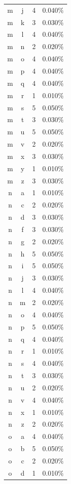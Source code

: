 \begin{longtable}{cccc}
    m & j & 4 & 0.040\% \\
    m & k & 3 & 0.030\% \\
    m & l & 4 & 0.040\% \\
    m & n & 2 & 0.020\% \\
    m & o & 4 & 0.040\% \\
    m & p & 4 & 0.040\% \\
    m & q & 4 & 0.040\% \\
    m & r & 1 & 0.010\% \\
    m & s & 5 & 0.050\% \\
    m & t & 3 & 0.030\% \\
    m & u & 5 & 0.050\% \\
    m & v & 2 & 0.020\% \\
    m & x & 3 & 0.030\% \\
    m & y & 1 & 0.010\% \\
    m & z & 3 & 0.030\% \\
    n & a & 1 & 0.010\% \\
    n & c & 2 & 0.020\% \\
    n & d & 3 & 0.030\% \\
    n & f & 3 & 0.030\% \\
    n & g & 2 & 0.020\% \\
    n & h & 5 & 0.050\% \\
    n & i & 5 & 0.050\% \\
    n & j & 3 & 0.030\% \\
    n & l & 4 & 0.040\% \\
    n & m & 2 & 0.020\% \\
    n & o & 4 & 0.040\% \\
    n & p & 5 & 0.050\% \\
    n & q & 4 & 0.040\% \\
    n & r & 1 & 0.010\% \\
    n & s & 4 & 0.040\% \\
    n & t & 3 & 0.030\% \\
    n & u & 2 & 0.020\% \\
    n & v & 4 & 0.040\% \\
    n & x & 1 & 0.010\% \\
    n & z & 2 & 0.020\% \\
    o & a & 4 & 0.040\% \\
    o & b & 5 & 0.050\% \\
    o & c & 2 & 0.020\% \\
    o & d & 1 & 0.010\% \\

\end{longtable}
